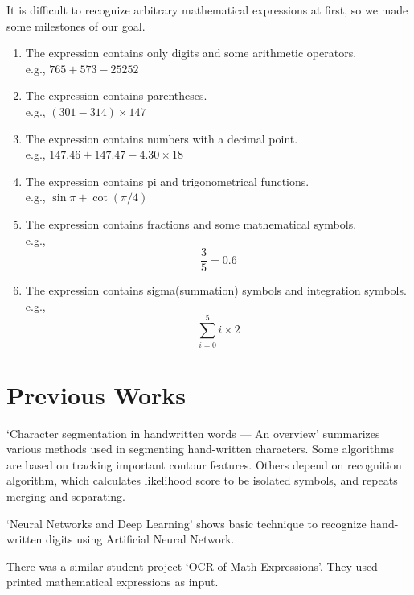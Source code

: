 \documentclass[10pt,twocolumn,letterpaper]{article}
\begin{document}
It is difficult to recognize arbitrary mathematical expressions at first, so we made some milestones of our goal.

\begin{enumerate}
\item The expression contains only digits and some arithmetic operators. \\
e.g., $765+573-25252$

\item The expression contains parentheses. \\
e.g., $(301-314)\times 147$

\item The expression contains numbers with a decimal point. \\
e.g., $147.46 + 147.47 - 4.30 \times 18$

\item The expression contains pi and trigonometrical functions. \\
e.g., $\sin \pi + \cot (\pi / 4)$

\item The expression contains fractions and some mathematical symbols. \\
e.g., $$ \frac{3}{5} = 0.6 $$

\item The expression contains sigma(summation) symbols and integration symbols. \\
e.g., $$ \sum_{i=0}^{5} i \times 2 $$

\end{enumerate}

\section{Previous Works}
`Character segmentation in handwritten words — An overview'
\cite{Lu199677} summarizes various methods used in segmenting hand-written characters.
Some algorithms are based on tracking important contour features.
Others depend on recognition algorithm,
which calculates likelihood score to be isolated symbols,
and repeats merging and separating.

`Neural Networks and Deep Learning' \cite{MichaelNielsen} shows basic technique to recognize hand-written digits using Artificial Neural Network.

There was a similar student project `OCR of Math Expressions'\cite{OCRMATH}.
They used printed mathematical expressions as input.

\end{document}
